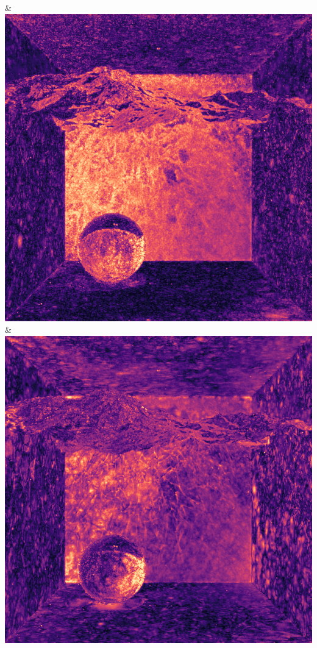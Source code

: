 & \includegraphics[width=\linewidth]{figures/py/tests/quality_comparison/nrc+sppc+Rej70+RejN_1spp_caustics_small_flip.png}
& \includegraphics[width=\linewidth]{figures/py/tests/quality_comparison/nrc+sppc14@1_1spp_caustics_small_flip.png}
